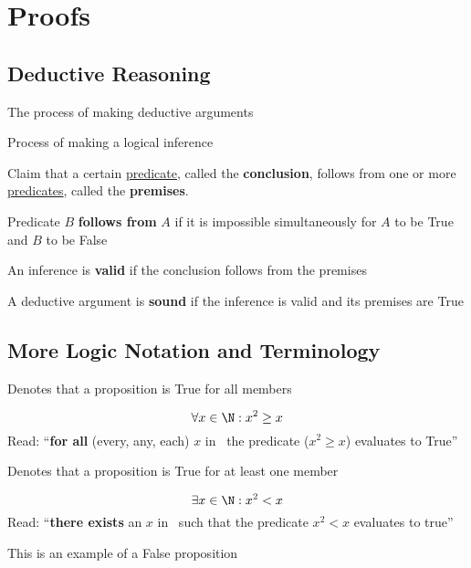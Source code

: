 \section{Proofs}
\subsection{Deductive Reasoning}
\begin{definition*}\label{def:deductive-reasoning}
    The process of making deductive arguments
\end{definition*}
\begin{definition*}\label{def:deductive-argument}
    Process of making a logical inference
\end{definition*}
\begin{definition*}[Inference]\label{def:inference}
    Claim that a certain \hyperref[def:predicate]{predicate}, called the \textbf{conclusion}, follows from one or more \hyperref[def:predicate]{predicates}, called the \textbf{premises}.
\end{definition*}
Predicate $B$ \textbf{follows from} $A$ if it is impossible simultaneously for $A$ to be True and $B$ to be False

An inference is \textbf{valid} if the conclusion follows from the premises

A deductive argument is \textbf{sound} if the inference is valid and its premises are True

\subsection{More Logic Notation and Terminology}
\begin{definition*}\label{def:universal-quantification-symbol}
    Denotes that a proposition is True for all members
\end{definition*}
\begin{eg}
    \[
    \forall x \in \N:x^2 \geq x
    \]
    Read: ``\textbf{for all} (every, any, each) $x$ in \N\ the predicate ($x^2 \geq x$) evaluates to True''
\end{eg}
\begin{definition*}\label{def:existential-quantification-symbol}
    Denotes that a proposition is True for at least one member
\end{definition*}
\begin{eg}
    \[
    \exists x \in \N:x^2<x
    \]
    Read: ``\textbf{there exists} an $x$ in \N\ such that the predicate $x^2<x$ evaluates to true''

    
\end{eg}
\begin{note}
        This is an example of a False proposition
\end{note}

